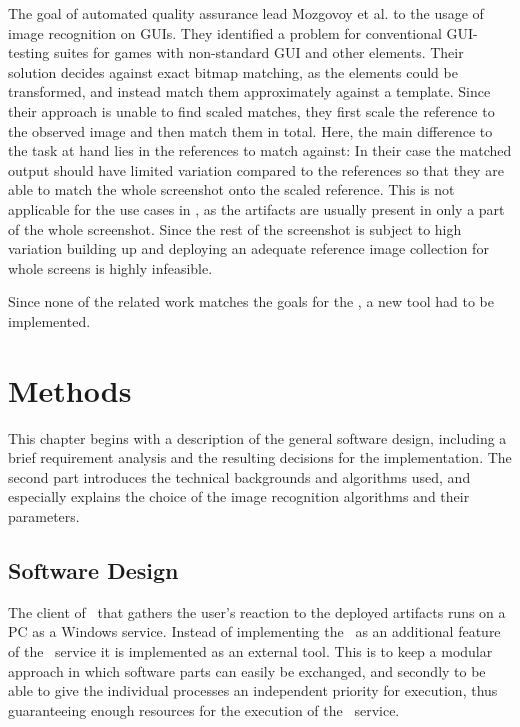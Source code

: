 The goal of automated quality assurance lead Mozgovoy et al. \cite{qa_image-rec} to the usage of image recognition on GUIs. They identified a problem for conventional GUI-testing suites for games with non-standard GUI and other elements. Their solution decides against exact bitmap matching, as the elements could be transformed, and instead match them approximately against a template. Since their approach is unable to find scaled matches, they first scale the reference to the observed image and then match them in total. Here, the main difference to the task at hand lies in the references to match against: In their case the matched output should have limited variation compared to the references so that they are able to match the whole screenshot onto the scaled reference. This is not applicable for the use cases in \ape, as the artifacts are usually present in only a part of the whole screenshot. Since the rest of the screenshot is subject to high variation building up and deploying an adequate reference image collection for whole screens is highly infeasible.

Since none of the related work matches the goals for the \vad, a new tool had to be implemented.

\chapter{Methods}\label{ch:methods}

This chapter begins with a description of the general software design, including a brief requirement analysis and the resulting decisions for the implementation. The second part introduces the technical backgrounds and algorithms used, and especially explains the choice of the image recognition algorithms and their parameters.

\section{Software Design}\label{sec:software-design}

The client of \ape~that gathers the user's reaction to the deployed artifacts runs on a PC as a Windows service. Instead of implementing the \vad~as an additional feature of the \ape~service it is implemented as an external tool. This is to keep a modular approach in which software parts can easily be exchanged, and secondly to be able to give the individual processes an independent priority for execution, thus guaranteeing enough resources for the execution of the \ape~service.

